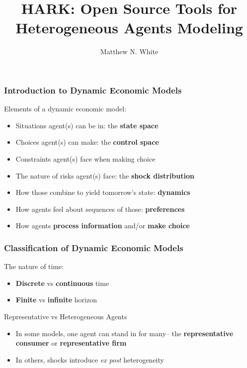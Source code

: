 \documentclass{beamer}
\title{HARK: Open Source Tools for\\ Heterogeneous Agents Modeling}
\author{Matthew N. White}
\institute{University of Delaware}
\newcommand{\bi}{\begin{itemize}}
\newcommand{\ei}{\end{itemize}}
\begin{document}
\begin{frame}
\maketitle
\end{frame}


\begin{frame}
\frametitle{Introduction to Dynamic Economic Models}

\begin{block}{Elements of a dynamic economic model:}
\bi
\item Situations agent(s) can be in: the \textbf{state space}

\item Choices agent(s) can make: the \textbf{control space}

\item Constraints agent(s) face when making choice

\item The nature of risks agent(s) face: the \textbf{shock distribution}

\item How those combine to yield tomorrow's state: \textbf{dynamics}

\item How agents feel about sequences of those: \textbf{preferences}

\item How agents \textbf{process information} and/or \textbf{make choice}

\ei
\end{block}

\end{frame}


\begin{frame}
\frametitle{Classification of Dynamic Economic Models}

\begin{block}{The nature of time:}
\bi
\item \textbf{Discrete} vs \textbf{continuous} time

\item \textbf{Finite} vs \textbf{infinite} horizon
\ei
\end{block}


\begin{block}{Representative vs Heterogeneous Agents}
\bi
\item In some models, one agent can stand in for many-- the \textbf{representative consumer} or \textbf{representative firm}

\item In others, shocks introduce \textit{ex post} heterogeneity
\ei
\end{block}

\end{frame}
\end{document}
